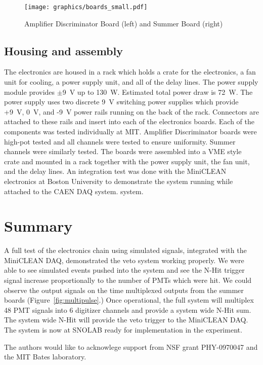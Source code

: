 \documentclass{JINST}
\begin{document}
\begin{figure}[ht]
\begin{center}
\texttt{[image: graphics/boards\_small.pdf]}
\caption{Amplifier Discriminator Board (left) and Summer Board (right)
\label{fig:boards}}
\end{center}
\end{figure}

\subsection{Housing and assembly}
\label{sec:Housing}
%
The electronics are housed in a rack which holds a crate for the
electronics, a fan unit for cooling, a power supply unit, and all of
the delay lines.  The power supply module provides $\pm$9~V up to
130~W.  Estimated total power draw is 72~W.  The power supply uses two
discrete 9~V switching power supplies which provide +9~V, 0~V, and -9~V
power rails running on the back of the rack.  Connectors are attached
to these rails and insert into each of the electronics boards.  Each
of the components was tested individually at MIT.  Amplifier
Discriminator boards were high-pot tested and all channels were tested
to ensure uniformity.  Summer channels were similarly tested.  The
boards were assembled into a VME style crate and mounted in a rack
together with the power supply unit, the fan unit, and the delay
lines.  An integration test was done with the MiniCLEAN electronics
at Boston University to
demonstrate the system running while attached to the CAEN DAQ system.
system.

\section{Summary}
\label{Summary}
%
A full test of the electronics chain using simulated signals,
integrated with the MiniCLEAN DAQ, demonstrated the veto
system working properly.  We were able to see simulated events pushed
into the system and see the N-Hit trigger signal increase
proportionally to the number of PMTs which were hit.  We could observe
the output signals on the time multiplexed outputs from the summer
boards (Figure~\ref{fig:multipulse}.)
Once operational, the full system will
multiplex 48 PMT signals into 6 digitizer channels and provide a
system wide N-Hit sum.  The system wide N-Hit will provide the veto
trigger to the MiniCLEAN DAQ.  The system is now at SNOLAB ready for
implementation in the experiment.

\acknowledgments
The authors would like to acknowlege support from NSF grant PHY-0970047 and the MIT Bates laboratory.
\end{document}
